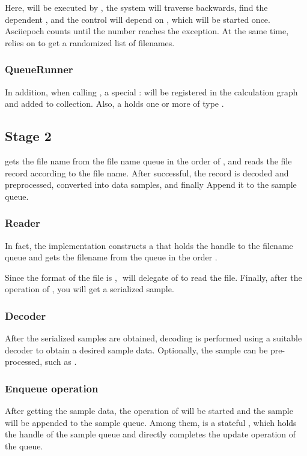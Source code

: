 \begin{content}
Here,  will be executed by , the system will traverse backwards, find the dependent , and the control will depend on , which will be started once. Ascii{epoch} counts until the  number reaches the  exception. At the same time,  relies on  to get a randomized list of filenames.


\subsubsection{QueueRunner}
In addition, when calling , a special : will be registered in the calculation graph and added to  collection. Also, a  holds one or more  of type .


\subsection{Stage 2}
 gets the file name from the file name queue in the order of , and reads the file record according to the file name. After successful, the record is decoded and preprocessed, converted into data samples, and finally Append it to the sample queue.


\subsubsection{Reader}
In fact, the implementation constructs a  that holds the handle to the filename queue and gets the filename from the queue in the order .

Since the format of the file is , ​​ will delegate  of  to read the file. Finally, after the operation of , you will get a serialized sample.


\subsubsection{Decoder}
After the serialized samples are obtained, decoding is performed using a suitable decoder to obtain a desired sample data. Optionally, the sample can be pre-processed, such as .


\subsubsection{Enqueue operation}
After getting the sample data, the operation of  will be started and the sample will be appended to the sample queue. Among them,  is a stateful , which holds the handle of the sample queue and directly completes the update operation of the queue.


\end{content}
